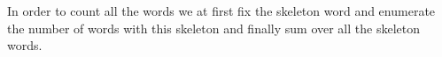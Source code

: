\documentclass[12pt]{article}
\numberwithin{equation}{section}
\numberwithin{equation}{section}
\theoremstyle{definition}
\renewcommand{\1}{\bf 1}
\begin{document}
%  
In order to count all the words we at first fix the skeleton word and enumerate the number of words with this skeleton and finally sum over all the skeleton words.\\
\end{document}
